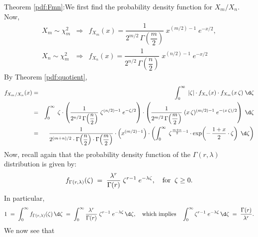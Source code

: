 \documentclass{article}
\begin{document}
\proofof Theorem \ref{pdf:Fmn}:\quad  We first find the probability density function for $X_{m}/X_{n}$.  Now,
\begin{eqnarray*}
                              X_{m} \sim \chi^{2}_{m}
&\Longrightarrow& f_{X_{m}}(x) = \dfrac{1}{2^{m/2}\,\Gamma\!\left(\dfrac{m}{2}\right)} \; x^{(m/2)-1} \; e^{-x/2}, \\
                              X_{n} \sim \chi^{2}_{m}
&\Longrightarrow& f_{X_{n}}(x) = \dfrac{1}{2^{n/2}\,\Gamma\!\left(\dfrac{n}{2}\right)} \; x^{(n/2)-1} \; e^{-x/2}
\end{eqnarray*}
By Theorem \ref{pdf:quotient},
\begin{eqnarray*}
        f_{X_{m}/X_{n}}(x)
&=&  \int_{0}^{\infty}\; |\zeta| \cdot f_{X_{n}}(x) \cdot f_{X_{m}}(x\,\zeta)\;\d\zeta \\
&=&  \int_{0}^{\infty}\;
        \zeta \cdot
        \left(\dfrac{1}{2^{n/2}\,\Gamma\!\left(\dfrac{n}{2}\right)} \; \zeta^{(n/2)-1} \; e^{-\zeta/2}\right) \cdot
        \left(\dfrac{1}{2^{m/2}\,\Gamma\!\left(\dfrac{m}{2}\right)} \; (x\,\zeta)^{(m/2)-1} \; e^{-(x\,\zeta)/2}\right)
        \;\d\zeta \\
&=&  \dfrac{1}{2^{(m+n)/2}\cdot\Gamma\!\left(\dfrac{n}{2}\right)\cdot\Gamma\!\left(\dfrac{m}{2}\right)} \cdot
        \left(x^{(m/2)-1}\right) \cdot
        \left(\int_{0}^{\infty}\;
        \zeta^{\frac{m+n}{2}-1}\cdot \exp\!\left(-\,\frac{1+x}{2}\cdot\zeta\right)
        \;\d\zeta\right) \\
\end{eqnarray*}
Now, recall again that the probability density function of the $\Gamma(r,\lambda)$ distribution is given by:
\begin{equation*}
f_{\Gamma(r,\lambda)}(\zeta) \; = \; \dfrac{\lambda^{r}}{\Gamma\!\left(r\right)} \; \zeta^{r-1} \; e^{-\lambda \zeta},
\quad\textnormal{for}\;\; \zeta \geq 0.
\end{equation*}
In particular,
\begin{equation*}
1 \; = \; \int_{0}^{\infty}f_{\Gamma(r,\lambda)}(\zeta)\,\d\zeta \; = \; \int_{0}^{\infty}\dfrac{\lambda^{r}}{\Gamma\!\left(r\right)} \; \zeta^{r-1} \; e^{-\lambda \zeta}\,\d\zeta,
\quad\textnormal{which implies}\quad
\int_{0}^{\infty}\zeta^{r-1} \; e^{-\lambda \zeta}\,\d\zeta
\; = \;
\dfrac{\Gamma\!\left(r\right)}{\lambda^{r}}.
\end{equation*}
We now see that
\end{document}
